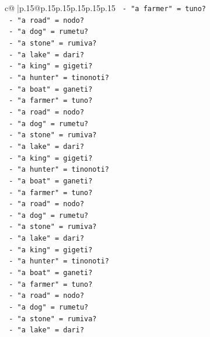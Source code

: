 \documentclass{article}
\begin{document}
{\begin{supertabular}{c@{$\;$}|p{.15\linewidth}@{}p{.15\linewidth}p{.15\linewidth}p{.15\linewidth}p{.15\linewidth}p{.15\linewidth}}
{{{\texttt{                {-} "a farmer" = tuno?} \\
\texttt{                {-} "a road" = nodo?} \\
\texttt{                {-} "a dog" = rumetu?} \\
\texttt{                {-} "a stone" = rumiva?} \\
\texttt{                {-} "a lake" = dari?} \\
\texttt{                {-} "a king" = gigeti?} \\
\texttt{                {-} "a hunter" = tinonoti?} \\
\texttt{                {-} "a boat" = ganeti?} \\
\texttt{                {-} "a farmer" = tuno?} \\
\texttt{                {-} "a road" = nodo?} \\
\texttt{                {-} "a dog" = rumetu?} \\
\texttt{                {-} "a stone" = rumiva?} \\
\texttt{                {-} "a lake" = dari?} \\
\texttt{                {-} "a king" = gigeti?} \\
\texttt{                {-} "a hunter" = tinonoti?} \\
\texttt{                {-} "a boat" = ganeti?} \\
\texttt{                {-} "a farmer" = tuno?} \\
\texttt{                {-} "a road" = nodo?} \\
\texttt{                {-} "a dog" = rumetu?} \\
\texttt{                {-} "a stone" = rumiva?} \\
\texttt{                {-} "a lake" = dari?} \\
\texttt{                {-} "a king" = gigeti?} \\
\texttt{                {-} "a hunter" = tinonoti?} \\
\texttt{                {-} "a boat" = ganeti?} \\
\texttt{                {-} "a farmer" = tuno?} \\
\texttt{                {-} "a road" = nodo?} \\
\texttt{                {-} "a dog" = rumetu?} \\
\texttt{                {-} "a stone" = rumiva?} \\
\texttt{                {-} "a lake" = dari?} \\
}}}
\end{supertabular}}
\end{document}
